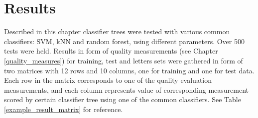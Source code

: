\section{Results}

Described in this chapter classifier trees were tested with various common classifiers: SVM, kNN and random forest, using different parameters. Over 500 tests were held. Results in form of quality measurements (see Chapter \ref{quality_measures}) for training, test and letters sets were gathered in form of two matrices with 12 rows and 10 columns, one for training and one for test data. Each row in the matrix corresponds to one of the quality evaluation measurements, and each column represents value of corresponding measurement scored by certain classifier tree using one of the common classifiers. See Table \ref{example_result_matrix} for reference.

